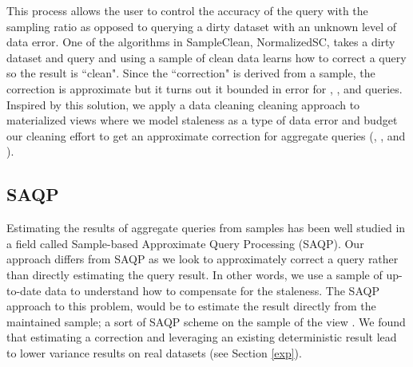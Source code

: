 This process allows the user to control the accuracy of the query with the sampling ratio as opposed to querying a dirty dataset with an unknown level of data error.
One of the algorithms in SampleClean, NormalizedSC, takes a dirty dataset and query and using a sample of clean data learns how
to correct a query so the result is ``clean".
Since the ``correction" is derived from a sample, the correction is approximate but it turns out it bounded in error for  \sumfunc, \countfunc, and \avgfunc queries.
Inspired by this solution, we apply a data cleaning cleaning approach to materialized views where we model staleness as a type of data error and budget our cleaning effort to get an approximate correction for aggregate queries (\sumfunc, \countfunc, and \avgfunc).

\subsection{SAQP}
Estimating the results of aggregate queries from samples has been
well studied in a field called Sample-based Approximate Query Processing
(SAQP). 
Our approach differs from SAQP as we look to
approximately correct a query rather than directly estimating the query result.
In other words, we use a sample of up-to-date data to understand how to compensate for the
staleness. 
The SAQP approach to this problem, would be to
estimate the result directly from the maintained sample; a sort of
SAQP scheme on the sample of the view \cite{joshi2008materialized}.
We found that estimating
a correction and leveraging an existing deterministic result lead
to lower variance results on real datasets (see Section \ref{exp}). 



